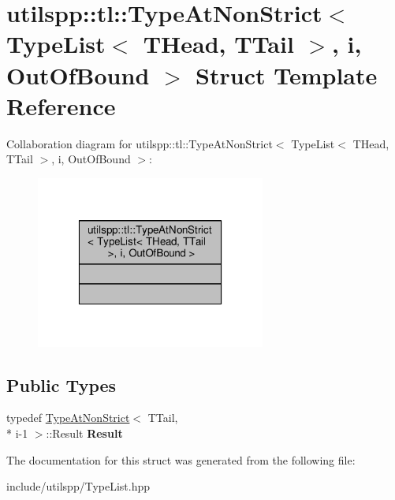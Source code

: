 \hypertarget{structutilspp_1_1tl_1_1TypeAtNonStrict_3_01TypeList_3_01THead_00_01TTail_01_4_00_01i_00_01OutOfBound_01_4}{\section{utilspp\-:\-:tl\-:\-:Type\-At\-Non\-Strict$<$ Type\-List$<$ T\-Head, T\-Tail $>$, i, Out\-Of\-Bound $>$ Struct Template Reference}
\label{structutilspp_1_1tl_1_1TypeAtNonStrict_3_01TypeList_3_01THead_00_01TTail_01_4_00_01i_00_01OutOfBound_01_4}
}


Collaboration diagram for utilspp\-:\-:tl\-:\-:Type\-At\-Non\-Strict$<$ Type\-List$<$ T\-Head, T\-Tail $>$, i, Out\-Of\-Bound $>$\-:\nopagebreak
\begin{figure}[H]
\begin{center}
\leavevmode
\includegraphics[width=214pt]{structutilspp_1_1tl_1_1TypeAtNonStrict_3_01TypeList_3_01THead_00_01TTail_01_4_00_01i_00_01OutOfBound_01_4__coll__graph}
\end{center}
\end{figure}
\subsection*{Public Types}
\begin{DoxyCompactItemize}
\item 
\hypertarget{structutilspp_1_1tl_1_1TypeAtNonStrict_3_01TypeList_3_01THead_00_01TTail_01_4_00_01i_00_01OutOfBound_01_4_a0f82dc55e7e14377d2658f6be288ca82}{typedef \hyperlink{structutilspp_1_1tl_1_1TypeAtNonStrict}{Type\-At\-Non\-Strict}$<$ T\-Tail, \\*
i-\/1 $>$\-::Result {\bfseries Result}}\label{structutilspp_1_1tl_1_1TypeAtNonStrict_3_01TypeList_3_01THead_00_01TTail_01_4_00_01i_00_01OutOfBound_01_4_a0f82dc55e7e14377d2658f6be288ca82}

\end{DoxyCompactItemize}


The documentation for this struct was generated from the following file\-:\begin{DoxyCompactItemize}
\item 
include/utilspp/Type\-List.\-hpp\end{DoxyCompactItemize}
